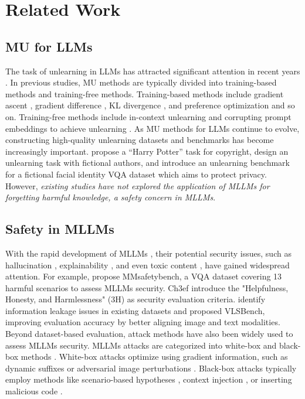 \section{Related Work}
\subsection{MU for LLMs}
The task of unlearning in LLMs has attracted significant attention in recent years \citep{barez2025openproblemsmachineunlearning}. In previous studies, MU methods are typically divided into training-based methods and training-free methods. Training-based methods include gradient ascent \citep{bourtoule2020machineunlearning}, gradient difference \citep{wang-etal-2023-kga,yao2023large}, KL divergence \citep{yao-etal-2024-machine}, and preference optimization \citep{maini2024tofutaskfictitiousunlearning} and so on. Training-free methods include in-context unlearning \citep{icunlearn} and corrupting prompt embeddings to achieve unlearning \citep{EmbeddingCorrupted}. As MU methods for LLMs continue to evolve, constructing high-quality unlearning datasets and benchmarks has become increasingly important. \citet{HarryPotter} propose a “Harry Potter” task for copyright, \citet{maini2024tofutaskfictitiousunlearning} design an unlearning task with fictional authors, and \citet{ma2024benchmarkingvisionlanguagemodel} introduce an unlearning benchmark for a fictional facial identity VQA dataset which aims to protect privacy. However, \textit{existing studies have not explored the application of MLLMs for forgetting harmful knowledge, a safety concern in MLLMs}.

\subsection{Safety in MLLMs}

With the rapid development of MLLMs \citep{li2025benchmark,yan2024survey,yan2025position}, their potential security issues, such as hallucination \citep{reefknot,zhou2024mitigating}, explainability \citep{huo2024mmneuron,huang2024miner}, and even toxic content \citep{toxic}, have gained widespread attention. For example, \citet{liu2025mm} propose MMsafetybench, a VQA dataset covering 13 harmful scenarios to assess MLLMs security. Ch3ef \citep{shi2024assessment} introduce the "Helpfulness, Honesty, and Harmlessness" (3H) as security evaluation criteria. \citet{hu2024vlsbench} identify information leakage issues in existing datasets and proposed VLSBench, improving evaluation accuracy by better aligning image and text modalities. Beyond dataset-based evaluation, attack methods have also been widely used to assess MLLMs security. MLLMs attacks are categorized into white-box and black-box methods \citep{yi2024jailbreak}. White-box attacks optimize using gradient information, such as dynamic suffixes \citep{zou2023universal} or adversarial image perturbations  \citep{shayegani2024jailbreak}. Black-box attacks typically employ methods like scenario-based hypotheses \citep{li2023deepinception,ding2023wolf}, context injection \citep{wei2023jailbreak}, or inserting malicious code \citep{kang2024exploiting}.